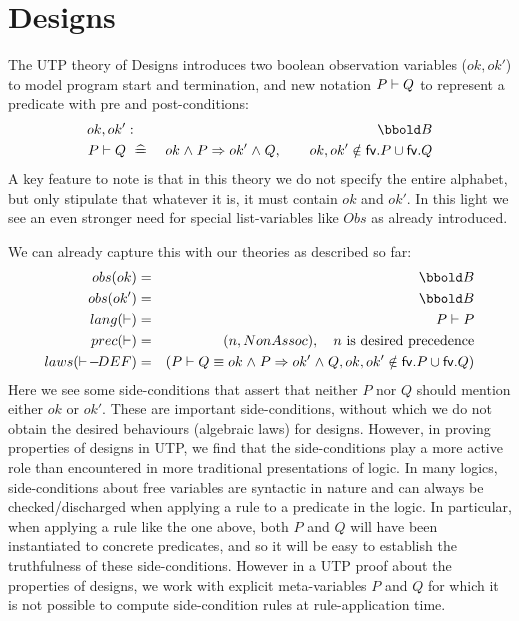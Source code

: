 \section{Designs}\label{sec:designs}


The UTP theory of Designs \cite[Chp 3]{UTP-book}
introduces two boolean observation variables ($ok, ok'$)
to model program start and termination, and new notation $P \vdash Q$
to represent a predicate with pre and post-conditions:
\begin{eqnarray*}
  ok,ok' &:& \Bool \\
  P \design Q &\defs& ok \land P \implies ok' \land Q
  , \qquad ok,ok' \notin \fv.P \cup \fv.Q
\end{eqnarray*}
A key feature to note is that in this theory we do not specify
the entire alphabet, but only stipulate that whatever it is,
it must contain $ok$ and $ok'$.
In this light we see an even stronger need for special list-variables
like $Obs$ as already introduced.

We can already capture this with our theories as described so far:
\begin{eqnarray*}
   obs(ok) &=& \Bool
\\ obs(ok') &=& \Bool
\\ lang(\design) &=& P \design P
\\ prec(\design) &=& (n,NonAssoc), \quad n \mbox{ is desired precedence}
\\ laws(\design\!-\!DEF)
   &=& (P \design Q \equiv ok \land P \implies ok' \land Q,
        ok,ok' \notin \fv.P \cup \fv.Q)
\end{eqnarray*}
Here we see some side-conditions that assert that neither $P$ nor $Q$ should
mention either $ok$ or $ok'$.
These are important side-conditions, without which we do not obtain the
desired behaviours (algebraic laws) for designs.
However, in proving properties of designs in UTP,
we find that the side-conditions play a more active role than encountered
in more traditional presentations of logic.
In many logics, side-conditions about free variables
are syntactic in nature and can always be checked/discharged
when applying a rule to a predicate in the logic.
In particular, when applying a rule like the one above, both $P$ and $Q$
will have been instantiated to concrete predicates, and so it will be
easy to establish the truthfulness of these side-conditions.
However in a UTP proof about the properties of designs,
we work with explicit meta-variables $P$ and $Q$
for which it is not possible to compute side-condition rules
at rule-application time.

